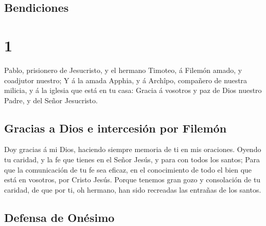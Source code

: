 \hypertarget{bendiciones}{%
\subsection{Bendiciones}\label{bendiciones}}

\hypertarget{section}{%
\section{1}\label{section}}

 Pablo, prisionero de Jesucristo, y el hermano Timoteo, á
Filemón amado, y coadjutor nuestro;  Y á la amada Apphia,
y á Archîpo, compañero de nuestra milicia, y á la iglesia que está en tu
casa:  Gracia á vosotros y paz de Dios nuestro Padre, y
del Señor Jesucristo.

\hypertarget{gracias-a-dios-e-intercesiuxf3n-por-filemuxf3n}{%
\subsection{Gracias a Dios e intercesión por
Filemón}\label{gracias-a-dios-e-intercesiuxf3n-por-filemuxf3n}}

 Doy gracias á mi Dios, haciendo siempre memoria de ti en
mis oraciones.  Oyendo tu caridad, y la fe que tienes en
el Señor Jesús, y para con todos los santos;  Para que la
comunicación de tu fe sea eficaz, en el conocimiento de todo el bien que
está en vosotros, por Cristo Jesús.  Porque tenemos gran
gozo y consolación de tu caridad, de que por ti, oh hermano, han sido
recreadas las entrañas de los santos.

\hypertarget{defensa-de-onuxe9simo}{%
\subsection{Defensa de Onésimo}\label{defensa-de-onuxe9simo}}

